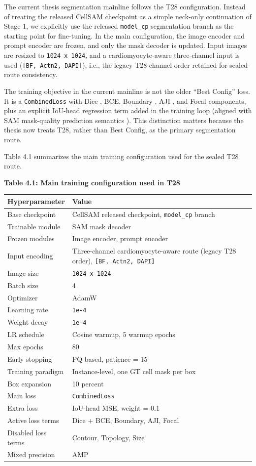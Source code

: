 The current thesis segmentation mainline follows the T28 configuration. Instead of treating the released CellSAM checkpoint as a simple neck-only continuation of Stage 1, we explicitly use the released \texttt{model\_cp} segmentation branch as the starting point for fine-tuning. In the main configuration, the image encoder and prompt encoder are frozen, and only the mask decoder is updated. Input images are resized to \texttt{1024\ x\ 1024}, and a cardiomyocyte-aware three-channel input is used (\texttt{[BF,\ Actn2,\ DAPI]}), i.e., the legacy T28 channel order retained for sealed-route consistency.

The training objective in the current mainline is not the older ``Best Config'' loss. It is a \texttt{CombinedLoss} with Dice \cite{milletari2016vnet}, BCE, Boundary \cite{kervadec2019boundary}, AJI \cite{kumar2017aji}, and Focal \cite{lin2017focal} components, plus an explicit IoU-head regression term added in the training loop (aligned with SAM mask-quality prediction semantics \cite{kirillov2023sam}). This distinction matters because the thesis now treats T28, rather than Best Config, as the primary segmentation route.

Table 4.1 summarizes the main training configuration used for the sealed T28 route.

\textbf{Table 4.1: Main training configuration used in T28}

{%
\begin{longtable}[]{@{}ll@{}}
\toprule\noalign{}
Hyperparameter & Value \\
\midrule\noalign{}
\endhead
\bottomrule\noalign{}
\endlastfoot
Base checkpoint & CellSAM released checkpoint, \texttt{model\_cp} branch \\
Trainable module & SAM mask decoder \\
Frozen modules & Image encoder, prompt encoder \\
Input encoding & Three-channel cardiomyocyte-aware route (legacy T28 order), \texttt{{[}BF,\ Actn2,\ DAPI{]}} \\
Image size & \texttt{1024\ x\ 1024} \\
Batch size & 4 \\
Optimizer & AdamW \\
Learning rate & \texttt{1e-4} \\
Weight decay & \texttt{1e-4} \\
LR schedule & Cosine warmup, 5 warmup epochs \\
Max epochs & 80 \\
Early stopping & PQ-based, patience = 15 \\
Training paradigm & Instance-level, one GT cell mask per box \\
Box expansion & 10 percent \\
Main loss & \texttt{CombinedLoss} \\
Extra loss & IoU-head MSE, weight = 0.1 \\
Active loss terms & Dice + BCE, Boundary, AJI, Focal \\
Disabled loss terms & Contour, Topology, Size \\
Mixed precision & AMP \\
\end{longtable}
}

